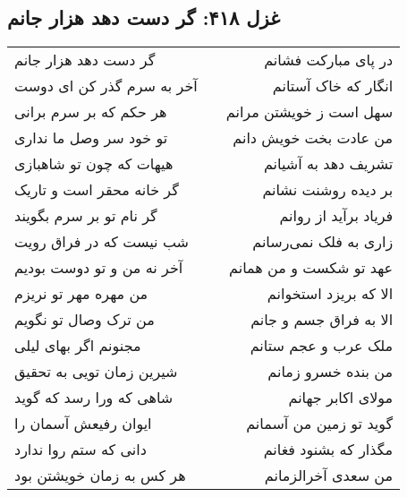 \begin{center}
\section*{غزل ۴۱۸: گر دست دهد هزار جانم}
\label{sec:418}
\begin{longtable}{l p{0.5cm} r}
گر دست دهد هزار جانم
&&
در پای مبارکت فشانم
\\
آخر به سرم گذر کن ای دوست
&&
انگار که خاک آستانم
\\
هر حکم که بر سرم برانی
&&
سهل است ز خویشتن مرانم
\\
تو خود سر وصل ما نداری
&&
من عادت بخت خویش دانم
\\
هیهات که چون تو شاهبازی
&&
تشریف دهد به آشیانم
\\
گر خانه محقر است و تاریک
&&
بر دیده روشنت نشانم
\\
گر نام تو بر سرم بگویند
&&
فریاد برآید از روانم
\\
شب نیست که در فراق رویت
&&
زاری به فلک نمی‌رسانم
\\
آخر نه من و تو دوست بودیم
&&
عهد تو شکست و من همانم
\\
من مهره مهر تو نریزم
&&
الا که بریزد استخوانم
\\
من ترک وصال تو نگویم
&&
الا به فراق جسم و جانم
\\
مجنونم اگر بهای لیلی
&&
ملک عرب و عجم ستانم
\\
شیرین زمان تویی به تحقیق
&&
من بنده خسرو زمانم
\\
شاهی که ورا رسد که گوید
&&
مولای اکابر جهانم
\\
ایوان رفیعش آسمان را
&&
گوید تو زمین من آسمانم
\\
دانی که ستم روا ندارد
&&
مگذار که بشنود فغانم
\\
هر کس به زمان خویشتن بود
&&
من سعدی آخرالزمانم
\\
\end{longtable}
\end{center}
